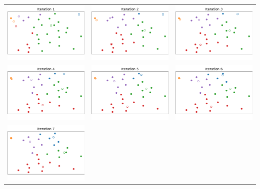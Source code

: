 \documentclass[a4paper, 12pt]{article}
\theoremstyle{definition}
\begin{document}
\LTR
\begin{center}
    \begin{tabular}{ccc}
        \includegraphics[width=.28\textwidth]{1/1.png} &
        \includegraphics[width=.28\textwidth]{1/2.png} &
        \includegraphics[width=.28\textwidth]{1/3.png}   \\
        \includegraphics[width=.28\textwidth]{1/4.png} &
        \includegraphics[width=.28\textwidth]{1/5.png} &
        \includegraphics[width=.28\textwidth]{1/6.png}   \\
        \includegraphics[width=.28\textwidth]{1/7.png} &

\end{tabular}
\end{center}
\end{document}
